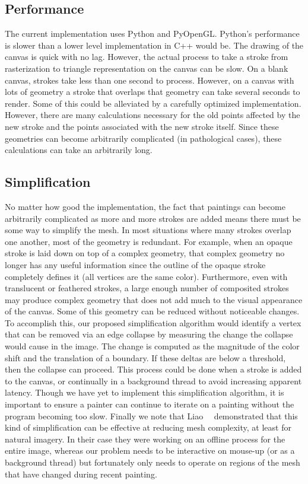 \documentclass[review]{acmsiggraph}
\begin{document}
\subsection{Performance}
The current implementation uses Python and PyOpenGL. Python's performance is slower than
a lower level implementation in C++ would be. The drawing of the canvas is quick with
no lag. However, the actual process to take a stroke from rasterization to triangle
representation on the canvas can be slow. On a blank canvas, strokes take less than
one second to process. However, on a canvas with lots of geometry a stroke that overlaps
that geometry can take several seconds to render. Some of this could be alleviated by a carefully optimized implementation. However, there are many calculations
necessary for the old points affected by the new stroke and the points associated with the
new stroke itself. Since these geometries can become arbitrarily complicated (in pathological cases), these
calculations can take an arbitrarily long.

\subsection{Simplification}
\label{sec:simplify}
No matter how good the implementation, the fact that paintings can become arbitrarily complicated as more and more strokes are added
means there must be some way to simplify the mesh. In most situations where
many strokes overlap one another, most of the geometry is redundant. For example, when an opaque stroke is laid down on top of a complex geometry, that complex
geometry no longer has any useful information since the outline of the opaque stroke
completely defines it (all vertices are the same color).  Furthermore, even with translucent or feathered strokes, a large enough number of 
composited strokes may produce complex geometry that does not add much to the visual appearance of the canvas. Some of this geometry can be reduced without noticeable changes.  To accomplish this, our proposed simplification algorithm would identify a vertex that can be removed via an edge collapse by measuring the change the collapse would cause in the image.  The change is computed as the magnitude of the color shift and the translation of a boundary.  If these deltas are below a threshold, then the collapse can proceed.  This process could be done when a stroke is added to the canvas, or continually in a background thread to avoid increasing apparent latency.  Though we have yet to implement this simplification algorithm, it is important to ensure a painter can continue to iterate on a painting without the program becoming too slow.
%
Finally we note that Liao~\etal~ demonstrated that this kind of simplification can be effective at reducing mesh complexity, at least for natural imagery.
%
In their case they were working on an offline process for the entire image, whereas our
problem needs to be interactive on mouse-up (or as a background thread) but fortunately
only needs to operate on regions of the mesh that have changed during recent painting.
\end{document}

